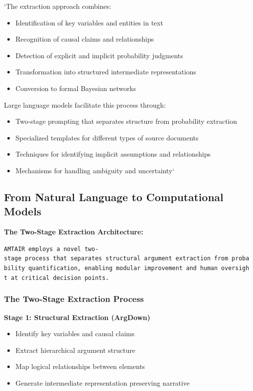 \documentclass[
  11pt,
  letterpaper,
]{book}
\providecommand{\tightlist}{%
  \setlength{\itemsep}{0pt}\setlength{\parskip}{0pt}}
\begin{document}
`The extraction approach combines:

\begin{itemize}
\tightlist
\item
  Identification of key variables and entities in text
\item
  Recognition of causal claims and relationships
\item
  Detection of explicit and implicit probability judgments
\item
  Transformation into structured intermediate representations
\item
  Conversion to formal Bayesian networks
\end{itemize}

Large language models facilitate this process through:

\begin{itemize}
\tightlist
\item
  Two-stage prompting that separates structure from probability
  extraction
\item
  Specialized templates for different types of source documents
\item
  Techniques for identifying implicit assumptions and relationships
\item
  Mechanisms for handling ambiguity and uncertainty`
\end{itemize}

\subsection{From Natural Language to Computational
Models}\label{sec-natural-to-computational}

\textbf{The Two-Stage Extraction Architecture:}

\texttt{AMTAIR\ employs\ a\ novel\ two-stage\ process\ that\ separates\ structural\ argument\ extraction\ from\ probability\ quantification,\ enabling\ modular\ improvement\ and\ human\ oversight\ at\ critical\ decision\ points.}

\subsubsection{The Two-Stage Extraction
Process}\label{sec-two-stage-extraction}

\textbf{Stage 1: Structural Extraction (ArgDown)}

\begin{itemize}
\tightlist
\item
  Identify key variables and causal claims
\item
  Extract hierarchical argument structure
\item
  Map logical relationships between elements
\item
  Generate intermediate representation preserving narrative
\end{itemize}
\end{document}
